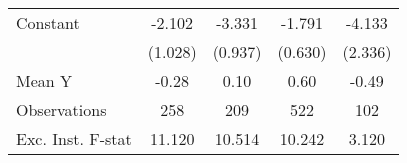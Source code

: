 {\begin{tabular}{l*{4}{c}}
\addlinespace
Constant            &      -2.102\sym{*}  &      -3.331\sym{***}&      -1.791\sym{***}&      -4.133         \\
                    &     (1.028)         &     (0.937)         &     (0.630)         &     (2.336)         \\
\midrule
Mean Y              &       -0.28         &        0.10         &        0.60         &       -0.49         \\
Observations        &         258         &         209         &         522         &         102         \\
Exc. Inst. F-stat   &      11.120         &      10.514         &      10.242         &       3.120         \\
\bottomrule
\end{tabular}
}
